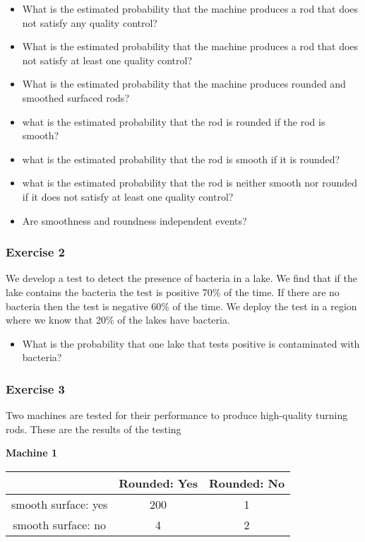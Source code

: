 \documentclass[
]{book}
\providecommand{\tightlist}{%
  \setlength{\itemsep}{0pt}\setlength{\parskip}{0pt}}
\begin{document}
\begin{itemize}
\item
  What is the estimated probability that the machine produces a rod that does not satisfy any quality control?
\item
  What is the estimated probability that the machine produces a rod that does not satisfy at least one quality control?
\item
  What is the estimated probability that the machine produces rounded and smoothed surfaced rods?
\item
  what is the estimated probability that the rod is rounded if the rod is smooth?
\item
  what is the estimated probability that the rod is smooth if it is rounded?
\item
  what is the estimated probability that the rod is neither smooth nor rounded if it does not satisfy at least one quality control?
\item
  Are smoothness and roundness independent events?
\end{itemize}

\hypertarget{exercise-2-2}{%
\subsubsection{Exercise 2}\label{exercise-2-2}}

We develop a test to detect the presence of bacteria in a lake. We find that if the lake contains the bacteria the test is positive 70\% of the time. If there are no bacteria then the test is negative 60\% of the time. We deploy the test in a region where we know that 20\% of the lakes have bacteria.

\begin{itemize}
\tightlist
\item
  What is the probability that one lake that tests positive is contaminated with bacteria?
\end{itemize}

\hypertarget{exercise-3}{%
\subsubsection{Exercise 3}\label{exercise-3}}

Two machines are tested for their performance to produce high-quality turning rods. These are the results of the testing

\textbf{Machine 1}

\begin{longtable}[]{@{}ccc@{}}
\toprule
& Rounded: Yes & Rounded: No \\
\midrule
\endhead
smooth surface: yes & 200 & 1 \\
smooth surface: no & 4 & 2 \\
\bottomrule
\end{longtable}
\end{document}
